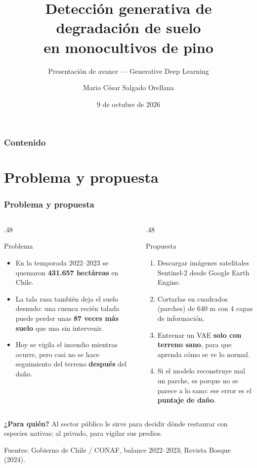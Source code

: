 \documentclass[10pt,aspectratio=169]{beamer}
\title[Avance VAE]{Detección generativa de degradación de suelo\\en monocultivos de pino}
\subtitle{Presentación de avance --- Generative Deep Learning}
\author[M. Salgado]{Mario César Salgado Orellana}
\institute[UdeC]{Universidad de Concepción}
\date{9 de octubre de 2026}
\begin{document}
{
  \begin{frame}[plain]
    \titlepage
  \end{frame}
}

\begin{frame}
  \frametitle{Contenido}
  \tableofcontents
\end{frame}

\section[Problema]{Problema y propuesta}

\begin{frame}
  \frametitle{Problema y propuesta}
  \small
  \begin{columns}[T]
    \begin{column}{.48\textwidth}
      \begin{block}{Problema}
        \begin{itemize}\itemsep0.3em
          \item En la temporada 2022--2023 se quemaron \textbf{431.657 hectáreas} en Chile.
          \item La tala rasa también deja el suelo desnudo: una cuenca recién talada puede perder unas \textbf{87 veces más suelo} que una sin intervenir.
          \item Hoy se vigila el incendio mientras ocurre, pero casi no se hace seguimiento del terreno \textbf{después} del daño.
        \end{itemize}
      \end{block}
    \end{column}
    \begin{column}{.48\textwidth}
      \begin{block}{Propuesta}
        \begin{enumerate}\itemsep0.3em
          \item Descargar imágenes satelitales Sentinel-2 desde Google Earth Engine.
          \item Cortarlas en cuadrados (parches) de 640 m con 4 capas de información.
          \item Entrenar un VAE \textbf{solo con terreno sano}, para que aprenda cómo se ve lo normal.
          \item Si el modelo reconstruye mal un parche, es porque no se parece a lo sano: ese error es el \textbf{puntaje de daño}.
        \end{enumerate}
      \end{block}
    \end{column}
  \end{columns}
  \vspace{0.6em}
  \textbf{¿Para quién?} Al sector público le sirve para decidir dónde restaurar con especies nativas; al privado, para vigilar sus predios.

  \vfill
  {\tiny Fuentes: Gobierno de Chile / CONAF, balance 2022--2023; Revista Bosque (2024).}
\end{frame}
\end{document}
